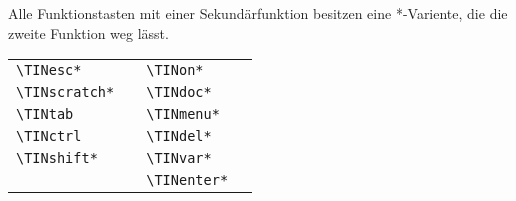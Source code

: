 \documentclass[11pt, a4paper]{scrartcl}
\newcommand{\makro}[1]{\texttt{\textbackslash #1}}
\begin{document}
Alle Funktionstasten mit einer Sekundärfunktion besitzen eine *-Variente, die die zweite Funktion weg lässt.
\begin{center}
\begin{tabular}{lc||lc}
	\makro{TINesc*}\hspace{1cm} &
	\TINesc*\hspace{1cm} & \hspace{1cm}
	\makro{TINon*}\hspace{1cm} & \TINon* \\
	\makro{TINscratch*}\hspace{1cm} &
	\TINscratch*\hspace{1cm} & \hspace{1cm}
	\makro{TINdoc*}\hspace{1cm} & 
	\TINdoc* \\
	\makro{TINtab}\hspace{1cm} &
	\TINtab\hspace{1cm} & \hspace{1cm}
	\makro{TINmenu*}\hspace{1cm} & 
	\TINmenu* \\
	\makro{TINctrl}\hspace{1cm} &
	\TINctrl\hspace{1cm} & \hspace{1cm}
	\makro{TINdel*}\hspace{1cm} & 
	\TINdel* \\
	\makro{TINshift*}\hspace{1cm} &
	\TINshift*\hspace{1cm} & \hspace{1cm}
	\makro{TINvar*}\hspace{1cm} & 
	\TINvar* \\
	&& \hspace{1cm}\makro{TINenter*}\hspace{1cm} & \TINenter* \\
\end{tabular}
\end{center}
\end{document}
